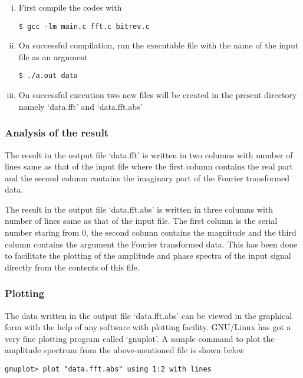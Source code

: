 \documentclass[a4paper,11pt]{report}
\begin{document}
\begin{enumerate}[(i)]
\item First compile the codes with
\begin{verbatim}
$ gcc -lm main.c fft.c bitrev.c
\end{verbatim}

\item On successful compilation, run the executable file with the name of the input file as an argument 

\begin{verbatim}
$ ./a.out data
\end{verbatim}

\item On successful execution two new files will be created in the present directory namely `data.fft' and `data.fft.abs'
\end{enumerate}

\subsubsection{Analysis of the result}
	
The result in the output file `data.fft' is written in two columns with number of lines same as that of the input file where the first column contains the real part and the second column contains the imaginary part of the Fourier transformed data.

The result in the output file `data.fft.abs' is written in three columns with number of lines same as that of the input file. The first column is the serial number staring from 0, the second column contains the magnitude and the third column contains the argument the Fourier transformed data. This has been done to facilitate the plotting of the amplitude and phase spectra of the input signal directly from the contents of this file.

\subsubsection{Plotting}

The data written in the output file `data.fft.abs' can be viewed in the graphical form with the help of any software with plotting facility. GNU/Linux has got a very fine plotting program called `gnuplot'. A sample command to plot the amplitude spectrum from the above-mentioned file is shown below 

\begin{verbatim}
gnuplot> plot "data.fft.abs" using 1:2 with lines
\end{verbatim}
\end{document}
